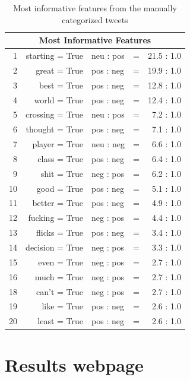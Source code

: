 \begin{table}[h]
	\begin{center}
		\begin{tabular*}{10cm}{@{\extracolsep{\fill}} | r @{\hspace{1cm}} r @{\hspace{1cm}} l l r |  }
			\hline
			\multicolumn{5}{|c|}{Most Informative Features} \\
			\hline
			1 & starting = True & neu : pos & = & 21.5 : 1.0\\
			2 & great = True & pos : neg & = & 19.9 : 1.0\\
			3 & best = True & pos : neg & = & 12.8 : 1.0\\
			4 & world = True & pos : neg & = & 12.4 : 1.0\\
			5 & crossing = True & neu : pos & = & 7.2 : 1.0\\
			6 & thought = True & pos : neg & = & 7.1 : 1.0\\
			7 & player = True & neu : neg & = & 6.6 : 1.0\\
			8 & class = True & pos : neg & = & 6.4 : 1.0\\
			9 & shit = True & neg : pos & = & 6.2 : 1.0\\
			10 & good = True & pos : neg & = & 5.1 : 1.0\\
			11 & better = True & pos : neg & = & 4.9 : 1.0\\
			12 & fucking = True & neg : pos & = & 4.4 : 1.0\\
			13 & flicks = True & pos : neg & = & 3.4 : 1.0\\
			14 & decision = True & neg : pos & = & 3.3 : 1.0\\
			15 & even = True & neg : pos & = & 2.7 : 1.0\\
			16 & much = True & neg : pos & = & 2.7 : 1.0\\
			18 & can't = True & neg : pos & = & 2.7 : 1.0\\
			19 & like = True & pos : neg & = & 2.6 : 1.0\\
			20 & least = True & pos : neg & = & 2.6 : 1.0\\
			\hline
		\end{tabular*}
	\end{center}
	\caption{ Most informative features from the manually categorized tweets }
\end{table}

\newpage
\section{Results webpage} \label{sec:ResultsWebpage}

